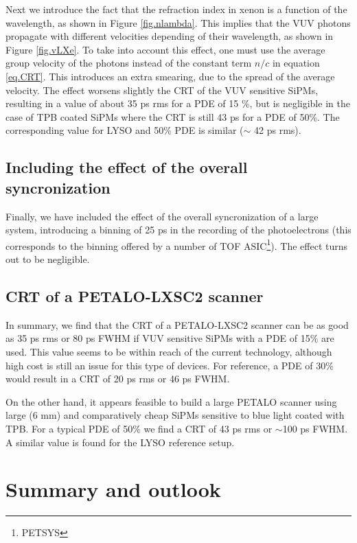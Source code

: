 \documentclass[review]{elsarticle}
\begin{document}
  Next we introduce the fact that the refraction index in xenon is a function of the wavelength, as shown in Figure \ref{fig.nlambda}. This implies that the VUV photons propagate with different velocities depending of their wavelength, as shown in Figure \ref{fig.vLXe}. To take into account this effect, one must use the average group velocity of the photons instead of the constant term $n/c$
in equation \ref{eq.CRT}. This introduces an extra smearing, due to the spread of the average velocity. The effect worsens slightly the CRT of the VUV sensitive SiPMs, resulting in a value of about 35 ps rms for a PDE of 15 \%, but is negligible in the case of TPB coated SiPMs where the CRT is still 43 ps for a PDE of 50\%. The corresponding value for LYSO and 50\% PDE is similar ($\sim$ 42 ps rms). 
  
  \subsection*{Including the effect of the overall syncronization}
  Finally, we have included the effect of the overall syncronization of a large system, introducing a binning of 25 ps in the recording of the photoelectrons (this corresponds to the binning offered by a number of TOF ASIC\footnote{PETSYS}). The effect turns out to be negligible.  
  
\subsection*{CRT of a PETALO-LXSC2 scanner}
In summary, we find that the CRT of a PETALO-LXSC2 scanner can be as good as 35 ps rms or 80 ps FWHM if VUV sensitive SiPMs with a PDE of 15\% are used. This value seems to be within reach of the current technology, although high cost is still an issue for this type of devices. For reference, a PDE of 30\% would result in a CRT of 20 ps rms or 46 ps FWHM. 

On the other hand, it appears feasible to build a large PETALO scanner using large (6 mm) and comparatively cheap SiPMs sensitive to blue light coated with TPB. For a typical PDE of 50\% we find a CRT of
43 ps rms or $\sim$100 ps FWHM. A similar value is found for the LYSO reference setup.


\section{Summary and outlook}\label{sec.conclu}
\end{document}
